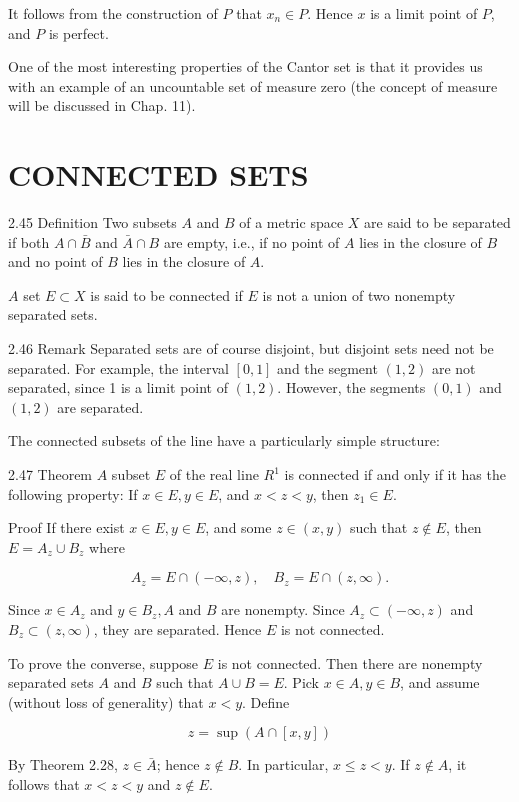 \documentclass[10pt]{article}
\begin{document}
It follows from the construction of $P$ that $x_{n} \in P$. Hence $x$ is a limit point of $P$, and $P$ is perfect.

One of the most interesting properties of the Cantor set is that it provides us with an example of an uncountable set of measure zero (the concept of measure will be discussed in Chap. 11).

\section{CONNECTED SETS}
2.45 Definition Two subsets $A$ and $B$ of a metric space $X$ are said to be separated if both $A \cap \bar{B}$ and $\bar{A} \cap B$ are empty, i.e., if no point of $A$ lies in the closure of $B$ and no point of $B$ lies in the closure of $A$.

$A$ set $E \subset X$ is said to be connected if $E$ is not a union of two nonempty separated sets.

2.46 Remark Separated sets are of course disjoint, but disjoint sets need not be separated. For example, the interval $[0,1]$ and the segment $(1,2)$ are not separated, since 1 is a limit point of $(1,2)$. However, the segments $(0,1)$ and $(1,2)$ are separated.

The connected subsets of the line have a particularly simple structure:

2.47 Theorem $A$ subset $E$ of the real line $R^{1}$ is connected if and only if it has the following property: If $x \in E, y \in E$, and $x<z<y$, then $z_{1} \in E$.

Proof If there exist $x \in E, y \in E$, and some $z \in(x, y)$ such that $z \notin E$, then $E=A_{z} \cup B_{z}$ where

$$
A_{z}=E \cap(-\infty, z), \quad B_{z}=E \cap(z, \infty) .
$$

Since $x \in A_{z}$ and $y \in B_{z}, A$ and $B$ are nonempty. Since $A_{z} \subset(-\infty, z)$ and $B_{z} \subset(z, \infty)$, they are separated. Hence $E$ is not connected.

To prove the converse, suppose $E$ is not connected. Then there are nonempty separated sets $A$ and $B$ such that $A \cup B=E$. Pick $x \in A, y \in B$, and assume (without loss of generality) that $x<y$. Define

$$
z=\sup (A \cap[x, y])
$$

By Theorem 2.28, $z \in \bar{A}$; hence $z \notin B$. In particular, $x \leq z<y$. If $z \notin A$, it follows that $x<z<y$ and $z \notin E$.
\end{document}
